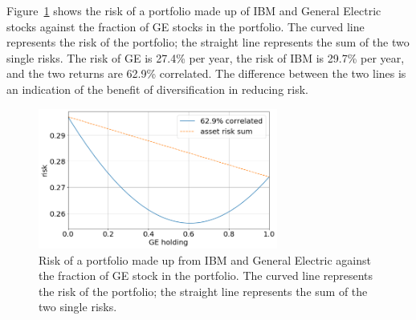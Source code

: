 Figure~\ref{fig:diversification} shows the risk of a portfolio made up of IBM and General Electric stocks against the fraction of GE stocks in the portfolio. The curved line represents the risk of the portfolio; the straight line represents the sum of the two single risks. The risk of GE is 27.4\% per year, the risk of IBM is 29.7\% per year, and the two returns are 62.9\% correlated. The difference between the two lines is an indication of the benefit of diversification in reducing risk.

\begin{figure}[htb]
\centering
\includegraphics[width=0.7\textwidth]{figures/diversification}
\caption{Risk of a portfolio made up from IBM and General Electric against the fraction of GE stock in the portfolio. The curved line represents the risk of the portfolio; the straight line represents the sum of the two single risks.}
\label{fig:diversification}
\end{figure}

%
%


